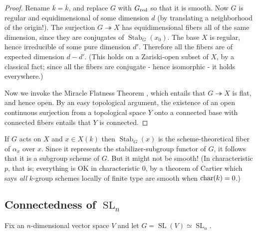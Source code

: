 \documentclass[10pt]{article}
\newcommand{\SL}{\operatorname{SL}}
\renewcommand{\(}{\left(}
\renewcommand{\)}{\right)}
\renewcommand{\bar}{\overline}
\newcommand{\Stab}{\operatorname{Stab}}
\newcommand{\onto}{\twoheadrightarrow }
\numberwithin{thm}{subsection}
\begin{document}
\begin{proof}
Rename $k=\bar k$, and replace $G$ with $G_{\rm{red}}$ so that it is smooth.
Now $G$ is regular and equidimensional of some dimension $d$
(by translating a neighborhood of the origin!).
The surjection $G\onto X$ has equidimensional fibers all of the same dimension,
since they are conjugates of $\Stab_G(x_0)$.
The base $X$ is regular, hence irreducible of some pure dimension $d'$.
Therefore all the fibers are of expected dimension $d-d'$.
(This holds on a Zariski-open subset of $X$, by a classical fact;
since all the fibers are conjugate - hence isomorphic - it holds everywhere.)

Now we invoke the Miracle Flatness Theorem  \cite[23.1]{crt}, 
which entails that $G\onto X$ is flat,
and hence open.
By an easy topological argument, the existence of 
an open continuous surjection from a topological space $Y$
onto a connected base with connected fibers entails that $Y$ is connected.
\end{proof}
\begin{rem}If $G$ acts on $X$ and $x\in X(k)$ then $\Stab_G(x)$
is the scheme-theoretical fiber of $\alpha_x$ over $x$.
Since it represents the stabilizer-subgroup functor of $G$,
it follows that it is a subgroup scheme of $G$.
But it might not be smooth! (In characteristic $p$, that is;
everything is OK in characteristic 0, by a theorem of Cartier
which says \textit{all} $k$-group schemes locally of finite type are smooth
when ${\rm{char}}(k)=0$.)
\end{rem}
\subsection{Connectedness of $\SL_n$}\label{slnconn}
Fix an $n$-dimensional vector space $V$ and let $G=\SL(V)\simeq \SL_n$.
\end{document}
